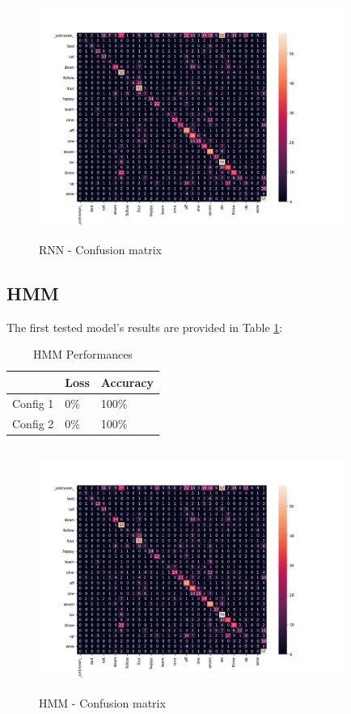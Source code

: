\begin{figure}[h]
			\centering
	    	\includegraphics[width=10cm, height=8cm]{conf_matrix_cnn_dii_cm}
	    	\caption{RNN - Confusion matrix}
	    	\label{fig:conf_matrix_cnn}
\end{figure} 



\subsection{\textbf{HMM}}
The first tested model's results are provided in Table \ref{table:hmm_performances}:\\
\begin{table}[h!]
\centering
\begin{tabular}{ p{1.5cm}|p{1.5cm}|p{1.5cm}| }
 \hline
   & Loss & Accuracy\\
\hline
Config 1 & 0\% & 100\%  \\
Config 2 & 0\% & 100\% \\
\hline
\end{tabular}
\caption{HMM Performances}
\label{table:hmm_performances}
\end{table}

\begin{figure}[h]
			\centering
	    	\includegraphics[width=10cm, height=8cm]{conf_matrix_cnn_dii_cm}
	    	\caption{HMM - Confusion matrix}
	    	\label{fig:conf_matrix_cnn}
\end{figure} 


